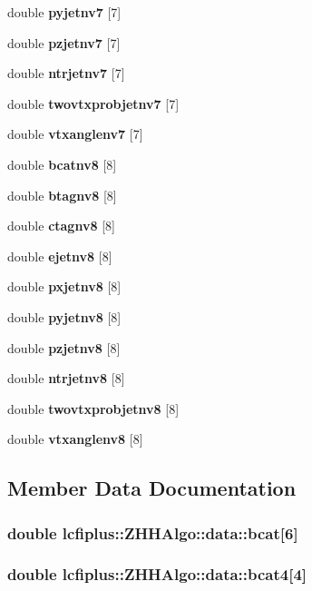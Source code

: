 \begin{DoxyCompactItemize}
double {\bf pyjetnv7} [7]
\item 
double {\bf pzjetnv7} [7]
\item 
double {\bf ntrjetnv7} [7]
\item 
double {\bf twovtxprobjetnv7} [7]
\item 
double {\bf vtxanglenv7} [7]
\item 
double {\bf bcatnv8} [8]
\item 
double {\bf btagnv8} [8]
\item 
double {\bf ctagnv8} [8]
\item 
double {\bf ejetnv8} [8]
\item 
double {\bf pxjetnv8} [8]
\item 
double {\bf pyjetnv8} [8]
\item 
double {\bf pzjetnv8} [8]
\item 
double {\bf ntrjetnv8} [8]
\item 
double {\bf twovtxprobjetnv8} [8]
\item 
double {\bf vtxanglenv8} [8]
\end{DoxyCompactItemize}


\subsection{Member Data Documentation}
\subsubsection[{bcat}]{\setlength{\rightskip}{0pt plus 5cm}double lcfiplus\-::\-Z\-H\-H\-Algo\-::data\-::bcat[6]}\label{structlcfiplus_1_1ZHHAlgo_1_1data_a6fcb9ce285bf3d4533e2561169457f2f}
\subsubsection[{bcat4}]{\setlength{\rightskip}{0pt plus 5cm}double lcfiplus\-::\-Z\-H\-H\-Algo\-::data\-::bcat4[4]}\label{structlcfiplus_1_1ZHHAlgo_1_1data_a752d7d257df5cade66beffad42c5e522}
